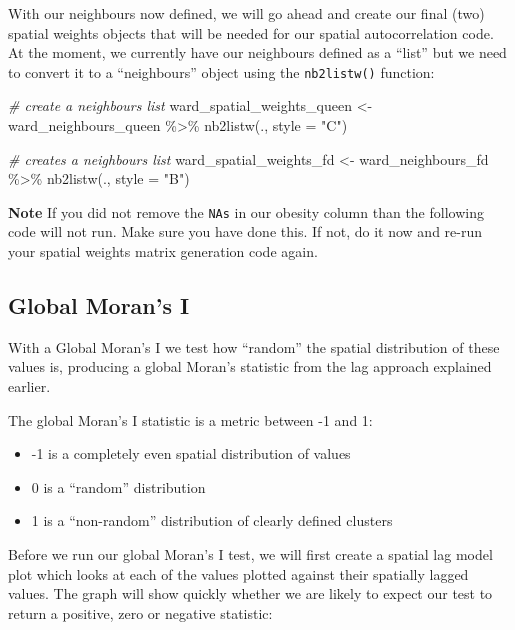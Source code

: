 \documentclass[
]{book}
\newenvironment{Shaded}{\begin{snugshade}}{\end{snugshade}}
\newcommand{\AttributeTok}[1]{\textcolor[rgb]{0.77,0.63,0.00}{#1}}
\newcommand{\CommentTok}[1]{\textcolor[rgb]{0.56,0.35,0.01}{\textit{#1}}}
\newcommand{\FunctionTok}[1]{\textcolor[rgb]{0.00,0.00,0.00}{#1}}
\newcommand{\NormalTok}[1]{#1}
\newcommand{\OtherTok}[1]{\textcolor[rgb]{0.56,0.35,0.01}{#1}}
\newcommand{\SpecialCharTok}[1]{\textcolor[rgb]{0.00,0.00,0.00}{#1}}
\newcommand{\StringTok}[1]{\textcolor[rgb]{0.31,0.60,0.02}{#1}}
\providecommand{\tightlist}{%
  \setlength{\itemsep}{0pt}\setlength{\parskip}{0pt}}
\begin{document}
With our neighbours now defined, we will go ahead and create our final (two) spatial weights objects that will be needed for our spatial autocorrelation code. At the moment, we currently have our neighbours defined as a ``list'' but we need to convert it to a ``neighbours'' object using the \texttt{nb2listw()} function:

\begin{Shaded}
\begin{Highlighting}[]
\CommentTok{\# create a neighbours list}
\NormalTok{ward\_spatial\_weights\_queen }\OtherTok{\textless{}{-}}\NormalTok{ ward\_neighbours\_queen }\SpecialCharTok{\%\textgreater{}\%}
    \FunctionTok{nb2listw}\NormalTok{(., }\AttributeTok{style =} \StringTok{"C"}\NormalTok{)}

\CommentTok{\# creates a neighbours list}
\NormalTok{ward\_spatial\_weights\_fd }\OtherTok{\textless{}{-}}\NormalTok{ ward\_neighbours\_fd }\SpecialCharTok{\%\textgreater{}\%}
    \FunctionTok{nb2listw}\NormalTok{(., }\AttributeTok{style =} \StringTok{"B"}\NormalTok{)}
\end{Highlighting}
\end{Shaded}

\textbf{Note}
If you did not remove the \texttt{NAs} in our obesity column than the following code will not run. Make sure you have done this. If not, do it now and re-run your spatial weights matrix generation code again.

\hypertarget{global-morans-i}{%
\subsection{Global Moran's I}\label{global-morans-i}}

With a Global Moran's I we test how ``random'' the spatial distribution of these values is, producing a global Moran's statistic from the lag approach explained earlier.

The global Moran's I statistic is a metric between -1 and 1:

\begin{itemize}
\tightlist
\item
  -1 is a completely even spatial distribution of values
\item
  0 is a ``random'' distribution
\item
  1 is a ``non-random'' distribution of clearly defined clusters
\end{itemize}

Before we run our global Moran's I test, we will first create a spatial lag model plot which looks at each of the values plotted against their spatially lagged values. The graph will show quickly whether we are likely to expect our test to return a positive, zero or negative statistic:
\end{document}
